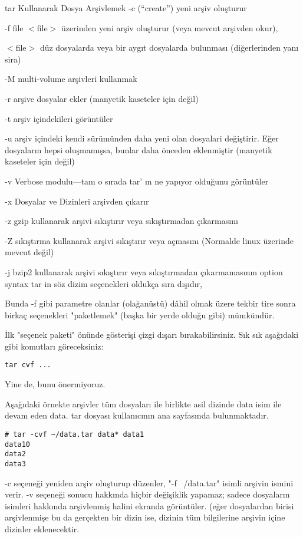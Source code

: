 \documentclass[10pt,a5paper]{book}
\begin{document}
\begin{section}{tar Kullanarak Dosya Arşivlemek}
-c (“create”) yeni arşiv oluşturur

-f file $<$file$>$ üzerinden yeni arşiv oluşturur (veya mevcut arşivden okur),

$<$file$>$ düz dosyalarda veya bir aygıt dosyalarda bulunması (diğerlerinden yanı sira)

-M multi-volume arşivleri kullanmak

-r arşive dosyalar ekler (manyetik kaseteler için değil)

-t arşiv içindekileri görüntüler

-u arşiv içindeki kendi sürümünden daha yeni olan dosyalari değiştirir. Eğer dosyaların hepsi oluşmamışsa, bunlar daha önceden eklenmiştir (manyetik kaseteler için değil)

-v Verbose modulu—tam o sırada tar' ın ne yapıyor olduğunu görüntüler

-x Dosyalar ve Dizinleri arşivden çıkarır

-z gzip kullanarak arşivi sıkıştırır veya sıkıştırmadan çıkarmasını

-Z sıkıştırma kullanarak arşivi sıkıştırır veya açmasını (Normalde linux üzerinde mevcut değil)

-j bzip2 kullanarak arşivi sıkıştırır veya sıkıştırmadan çıkarmamasının
option syntax tar in söz dizim seçenekleri oldukça sıra dışıdır,

Bunda -f gibi parametre olanlar (olağanüstü) dâhil olmak üzere tekbir tire sonra birkaç seçenekleri "paketlemek" (başka bir yerde olduğu gibi) mümkündür.

İlk "seçenek paketi" önünde gösterişi çizgi dışarı bırakabilirsiniz. Sık sık aşağıdaki gibi komutları göreceksiniz:
\begin{verbatim}
tar cvf ...
\end{verbatim}
Yine de,  bunu önermiyoruz.

Aşağıdaki örnekte arşivler tüm dosyaları ile birlikte asil dizinde data isim ile devam eden data. tar dosyası kullanıcının ana sayfasında bulunmaktadır.
\begin{verbatim}
# tar -cvf ~/data.tar data* data1
data10
data2
data3
\end{verbatim}
-c seçeneği yeniden arşiv oluşturup düzenler, "-f ~/data.tar" isimli arşivin ismini verir. -v seçeneği sonucu hakkında hiçbir değişiklik yapamaz; sadece dosyaların isimleri hakkında arşivlenmiş halini ekranda görüntüler. (eğer dosyalardan birisi arşivlenmişe bu da gerçekten bir dizin ise, dizinin tüm bilgilerine arşivin içine dizinler eklenecektir.


\end{section}
\end{document}
